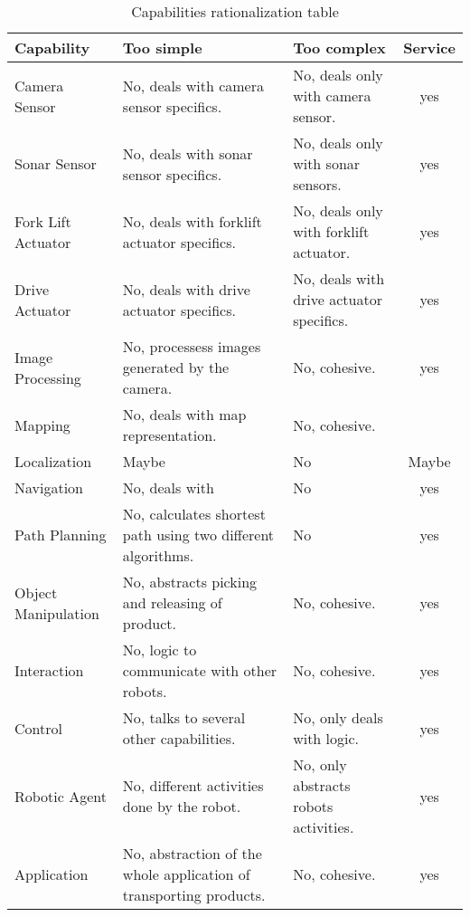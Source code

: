\begin{table}[h]
	\centering
	\begin{tabular}{| l | p{3.2cm} | p{3.2cm} | c |}
		\hline
		Capability & Too simple & Too complex & Service\\
		\hline
		Camera Sensor 		& No, deals with camera sensor specifics. & No, deals only with camera sensor. & yes\\
		\hline
		Sonar Sensor 		& No, deals with sonar sensor specifics. & No, deals only with sonar sensors. & yes\\
		\hline
		Fork Lift Actuator 	& No, deals with forklift actuator specifics. & No, deals only with forklift actuator. & yes\\
		\hline
		Drive Actuator 		& No, deals with drive actuator specifics. & No, deals with drive actuator specifics. & yes\\
		\hline
		Image Processing 	& No, processess images generated by the camera. & No, cohesive. & yes\\
		\hline
		Mapping 			& No, deals with map representation. & No, cohesive. &\\
		\hline
		Localization 		& Maybe & No & Maybe\\ %
		\hline
		Navigation 			& No, deals with & No & yes\\
		\hline
		Path Planning 		& No, calculates shortest path using two different algorithms. & No & yes\\
		\hline
		Object Manipulation & No, abstracts picking and releasing of product. & No, cohesive. & yes\\
		\hline
		Interaction 		& No, logic to communicate with other robots. & No, cohesive. & yes\\
		\hline
		Control 			& No, talks to several other capabilities. & No, only deals with logic. & yes\\
		\hline
		Robotic Agent 		& No, different activities done by the robot. & No, only abstracts robots activities. & yes\\
		\hline
		Application 		& No, abstraction of the whole application of transporting products. & No, cohesive. & yes\\
		\hline
	\end{tabular}
	\caption{Capabilities rationalization table}
\end{table}
